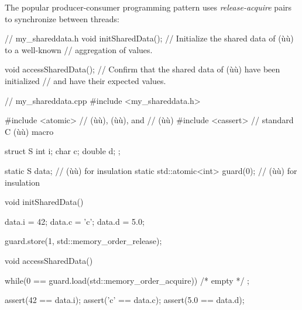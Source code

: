 The popular producer-consumer programming pattern uses
\emph{release-acquire} pairs to synchronize between threads:

%
%
%
%
\newpage%
\begin{emcppslisting}
// my_shareddata.h                                                              
void initSharedData();                                                          
    // Initialize the shared data of (ù{}ù) to a well-known          
    // aggregation of values.                                                   
                                                                                
void accessSharedData();                                                        
    // Confirm that the shared data of (ù{}ù) have been initialized  
    // and have their expected values.
\end{emcppslisting}
\vspace*{2ex}
\begin{emcppslisting}
// my_shareddata.cpp
#include <my_shareddata.h>

#include <atomic>  // (ù{}ù), (ù{}ù), and
                   // (ù{}ù)
#include <cassert> // standard C (ù{}ù) macro

struct S
{
    int    i;
    char   c;
    double d;
};

static S                data;     // (ù{}ù) for insulation
static std::atomic<int> guard(0); // (ù{}ù) for insulation

void initSharedData()
{
    data.i = 42;
    data.c = 'c';
    data.d = 5.0;

    guard.store(1, std::memory_order_release);
}

void accessSharedData()
{
    while(0 == guard.load(std::memory_order_acquire))
        /* empty */ ;

    assert(42  == data.i);
    assert('c' == data.c);
    assert(5.0 == data.d);
}
\end{emcppslisting}
